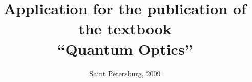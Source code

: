 \title{Application for the publication of the textbook \\ ``Quantum Optics''}
\author{}
\date{Saint Petersburg, 2009}
\maketitle
\newpage
